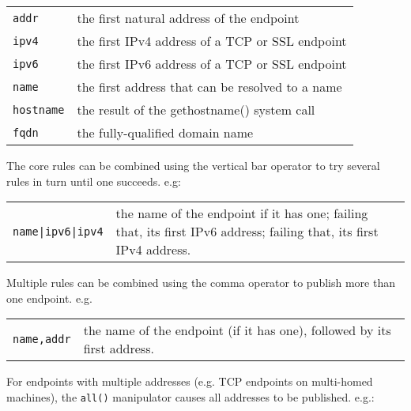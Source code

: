 \documentclass[11pt,twoside,a4paper]{book}
\newcommand{\code}[1]{\texttt{#1}}
\begin{document}
\vspace{\baselineskip}

\begin{tabular}{p{}p{}}
\code{addr} &     the first natural address of the endpoint\\
\code{ipv4} &     the first IPv4 address of a TCP or SSL endpoint\\
\code{ipv6} &     the first IPv6 address of a TCP or SSL endpoint\\
\code{name} &     the first address that can be resolved to a name\\
\code{hostname} & the result of the gethostname() system call\\
\code{fqdn} &     the fully-qualified domain name\\
\end{tabular}

\vspace{\baselineskip}

\noindent
The core rules can be combined using the vertical bar operator to
try several rules in turn until one succeeds. e.g:

\vspace{\baselineskip}

\begin{tabular}{p{}p{}}
\code{name|ipv6|ipv4} & the name of the endpoint if it has one;
                 	failing that, its first IPv6 address;
                 	failing that, its first IPv4 address.
\end{tabular}

\vspace{\baselineskip}

\noindent
Multiple rules can be combined using the comma operator to
publish more than one endpoint. e.g.

\vspace{\baselineskip}

\begin{tabular}{p{}p{}}
\code{name,addr} & the name of the endpoint (if it has one),
                   followed by its first address.
\end{tabular}

\vspace{\baselineskip}

\noindent
For endpoints with multiple addresses (e.g. TCP endpoints on
multi-homed machines), the \code{all()} manipulator causes all
addresses to be published. e.g.:
\end{document}
